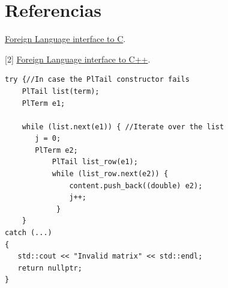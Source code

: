 \documentclass[a4paper]{article}
\begin{document}
\section{Referencias}
\begin{flushleft}
[1] \href{http://www.swi-prolog.org/pldoc/man?section=foreign}{Foreign Language interface to C}.

[2] \href{http://www.swi-prolog.org/pldoc/doc_for?object=section('packages/pl2cpp.html')}{Foreign Language interface to C++}.\\
\end{flushleft}

\begin{lstlisting}[style=C++]
try {//In case the PlTail constructor fails
	PlTail list(term);	
   	PlTerm e1;

    while (list.next(e1)) { //Iterate over the list
       j = 0;
       PlTerm e2;
           PlTail list_row(e1);
           while (list_row.next(e2)) {
               content.push_back((double) e2);
               j++;
      		}   
    }
catch (...)
{
   std::cout << "Invalid matrix" << std::endl;
   return nullptr;
}
\end{lstlisting}
\end{document}
